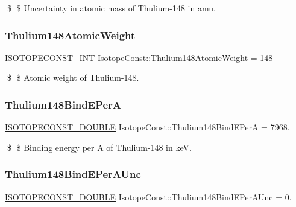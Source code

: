 \$ \$ Uncertainty in atomic mass of Thulium-\/148 in amu. \mbox{\label{group___isotope_const-_thulium-_tm148_ga87f76ed5ec200c56e974556f2755fff5}} 
\subsubsection{\texorpdfstring{Thulium148\+Atomic\+Weight}{Thulium148AtomicWeight}}
{\footnotesize\ttfamily \mbox{\hyperlink{group___isotope_const-_macros_ga5f18360b3e99483a35c32d789e62621c}{I\+S\+O\+T\+O\+P\+E\+C\+O\+N\+S\+T\+\_\+\+I\+NT}} Isotope\+Const\+::\+Thulium148\+Atomic\+Weight = 148}

\$ \$ Atomic weight of Thulium-\/148. \mbox{\label{group___isotope_const-_thulium-_tm148_ga4b2b983d822869bc6d621b76187c827c}} 
\subsubsection{\texorpdfstring{Thulium148\+Bind\+E\+PerA}{Thulium148BindEPerA}}
{\footnotesize\ttfamily \mbox{\hyperlink{group___isotope_const-_macros_ga8f45a7272ce02c0b4c65c44636ed719a}{I\+S\+O\+T\+O\+P\+E\+C\+O\+N\+S\+T\+\_\+\+D\+O\+U\+B\+LE}} Isotope\+Const\+::\+Thulium148\+Bind\+E\+PerA = 7968.}

\$ \$ Binding energy per A of Thulium-\/148 in keV. \mbox{\label{group___isotope_const-_thulium-_tm148_ga6df212f7d42a24704b4479eb7c016991}} 
\subsubsection{\texorpdfstring{Thulium148\+Bind\+E\+Per\+A\+Unc}{Thulium148BindEPerAUnc}}
{\footnotesize\ttfamily \mbox{\hyperlink{group___isotope_const-_macros_ga8f45a7272ce02c0b4c65c44636ed719a}{I\+S\+O\+T\+O\+P\+E\+C\+O\+N\+S\+T\+\_\+\+D\+O\+U\+B\+LE}} Isotope\+Const\+::\+Thulium148\+Bind\+E\+Per\+A\+Unc = 0.}

